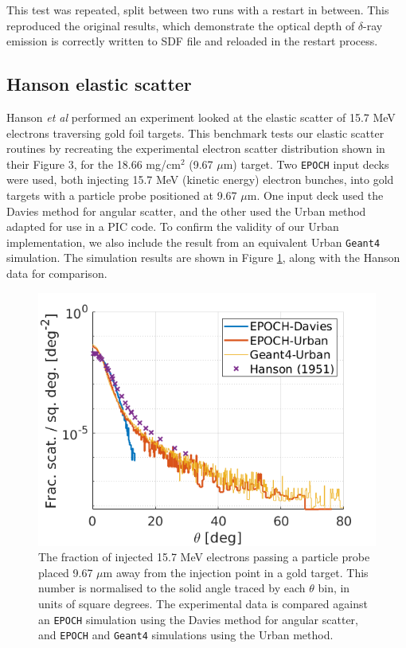 \documentclass[12pt]{article}
\numberwithin{equation}{section}
\begin{document}
This test was repeated, split between two runs with a restart in between. This reproduced the original results, which demonstrate the optical depth of $\delta$-ray emission is correctly written to SDF file and reloaded in the restart process.

\subsection{Hanson elastic scatter} \label{sec:bench:Hanson}

Hanson \textit{et al} \cite{benchmark:Hanson} performed an experiment looked at the elastic scatter of 15.7 MeV electrons traversing gold foil targets. This benchmark tests our elastic scatter routines by recreating the experimental electron scatter distribution shown in their Figure 3, for the 18.66 mg/$\text{cm}^2$ (9.67 $\mu$m) target. Two \texttt{EPOCH} input decks were used, both injecting 15.7 MeV (kinetic energy) electron bunches, into gold targets with a particle probe positioned at 9.67 $\mu$m. One input deck used the Davies method for angular scatter, and the other used the Urban method adapted for use in a PIC code. To confirm the validity of our Urban implementation, we also include the result from an equivalent Urban \texttt{Geant4} simulation. The simulation results are shown in Figure \ref{fig:bench:hanson}, along with the Hanson data for comparison.

\begin{figure}
\centering
  \includegraphics[width=0.6\linewidth]{Figures/bench_Hanson.png}
\caption{The fraction of injected 15.7 MeV electrons passing a particle probe placed 9.67 $\mu$m away from the injection point in a gold target. This number is normalised to the solid angle traced by each $\theta$ bin, in units of square degrees. The experimental data \cite{benchmark:Hanson} is compared against an \texttt{EPOCH} simulation using the Davies method for angular scatter, and \texttt{EPOCH} and \texttt{Geant4} simulations using the Urban method.}
\label{fig:bench:hanson}
\end{figure}
\end{document}

